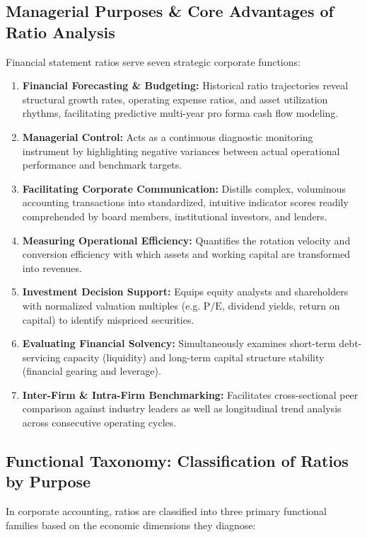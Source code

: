 \subsection{Managerial Purposes \& Core Advantages of Ratio Analysis}
Financial statement ratios serve seven strategic corporate functions:
\begin{enumerate}[leftmargin=*, topsep=3pt, itemsep=3pt]
    \item \textbf{Financial Forecasting \& Budgeting:} Historical ratio trajectories reveal structural growth rates, operating expense ratios, and asset utilization rhythms, facilitating predictive multi-year pro forma cash flow modeling.
    \item \textbf{Managerial Control:} Acts as a continuous diagnostic monitoring instrument by highlighting negative variances between actual operational performance and benchmark targets.
    \item \textbf{Facilitating Corporate Communication:} Distills complex, voluminous accounting transactions into standardized, intuitive indicator scores readily comprehended by board members, institutional investors, and lenders.
    \item \textbf{Measuring Operational Efficiency:} Quantifies the rotation velocity and conversion efficiency with which assets and working capital are transformed into revenues.
    \item \textbf{Investment Decision Support:} Equips equity analysts and shareholders with normalized valuation multiples (e.g. $\text{P/E}$, dividend yields, return on capital) to identify mispriced securities.
    \item \textbf{Evaluating Financial Solvency:} Simultaneously examines short-term debt-servicing capacity (liquidity) and long-term capital structure stability (financial gearing and leverage).
    \item \textbf{Inter-Firm \& Intra-Firm Benchmarking:} Facilitates cross-sectional peer comparison against industry leaders as well as longitudinal trend analysis across consecutive operating cycles.
\end{enumerate}

\subsection{Functional Taxonomy: Classification of Ratios by Purpose}
In corporate accounting, ratios are classified into three primary functional families based on the economic dimensions they diagnose:

